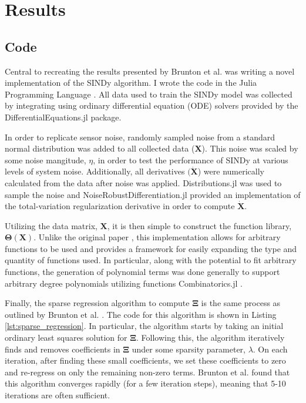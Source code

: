 \documentclass[10pt]{paper}
\begin{document}
\section{Results} \label{sec:results}
\subsection{Code} \label{sec:code}
Central to recreating the results presented by Brunton et al. was writing a novel implementation of the SINDy algorithm.
I wrote the code in the Julia Programming Language \cite{julia}.
All data used to train the SINDy model was collected by integrating using ordinary differential equation (ODE) solvers provided by the DifferentialEquations.jl \cite{rackauckas2017differentialequations} package.

In order to replicate sensor noise, randomly sampled noise from a standard normal distribution was added to all collected data ($\mathbf X$).
This noise was scaled by some noise mangitude, $\eta$, in order to test the performance of SINDy at various levels of system noise. Additionally, all derivatives $(\mathbf {\dot X}$) were numerically calculated from the data after noise was applied. 
Distributions.jl \cite{JSSv098i16}\cite{Distributions.jl-2019} was used to sample the noise and NoiseRobustDifferentiation.jl \cite{chartrand2011numerical}\cite{NoiseRobustDifferentiation.jl} provided an implementation of the total-variation regularization derivative in order to compute $\mathbf{\dot X}$. 

Utilizing the data matrix, $\mathbf X$, it is then simple to construct the function library, $\mathbf \Theta(\mathbf X)$.
Unlike the original paper \cite{sindy}, this implementation allows for arbitrary functions to be used and provides a framework for easily expanding the type and quantity of functions used. 
In particular, along with the potential to fit arbitrary functions, the generation of polynomial terms was done generally to support arbitrary degree polynomials utilizing functions Combinatorics.jl \cite{Combinatorics.jl}.

Finally, the sparse regression algorithm to compute $\mathbf \Xi$ is the same process as outlined by Brunton et al. \cite{sindy}. The code for this algorithm is shown in Listing \ref{lst:sparse_regression}.
In particular, the algorithm starts by taking an initial ordinary least squares solution for $\mathbf \Xi$. Following this, the algorithm iteratively finds and removes coefficients in $\mathbf \Xi$ under some sparsity parameter, $\lambda$. On each iteration, after finding these small coefficients, we set these coefficients to zero and re-regress on only the remaining non-zero terms. 
Brunton et al. found that this algorithm converges rapidly (for a few iteration steps), meaning that 5-10 iterations are often sufficient. 
\end{document}
